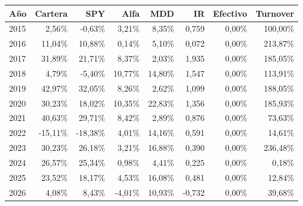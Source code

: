 \begin{tabular}{lrrrrrrr}
\toprule
Año & Cartera & SPY & Alfa & MDD & IR & Efectivo & Turnover \\
\midrule
2015 & 2,56\% & -0,63\% & 3,21\% & 8,35\% & 0,759 & 0,00\% & 100,00\% \\
2016 & 11,04\% & 10,88\% & 0,14\% & 5,10\% & 0,072 & 0,00\% & 213,87\% \\
2017 & 31,89\% & 21,71\% & 8,37\% & 2,03\% & 1,935 & 0,00\% & 185,05\% \\
2018 & 4,79\% & -5,40\% & 10,77\% & 14,80\% & 1,547 & 0,00\% & 113,91\% \\
2019 & 42,97\% & 32,05\% & 8,26\% & 2,62\% & 1,099 & 0,00\% & 188,05\% \\
2020 & 30,23\% & 18,02\% & 10,35\% & 22,83\% & 1,356 & 0,00\% & 185,93\% \\
2021 & 40,63\% & 29,71\% & 8,42\% & 2,89\% & 0,876 & 0,00\% & 73,63\% \\
2022 & -15,11\% & -18,38\% & 4,01\% & 14,16\% & 0,591 & 0,00\% & 14,61\% \\
2023 & 30,23\% & 26,18\% & 3,21\% & 16,88\% & 0,390 & 0,00\% & 236,48\% \\
2024 & 26,57\% & 25,34\% & 0,98\% & 4,41\% & 0,225 & 0,00\% & 0,18\% \\
2025 & 23,52\% & 18,17\% & 4,53\% & 16,08\% & 0,481 & 0,00\% & 12,84\% \\
2026 & 4,08\% & 8,43\% & -4,01\% & 10,93\% & -0,732 & 0,00\% & 39,68\% \\
\bottomrule
\end{tabular}
